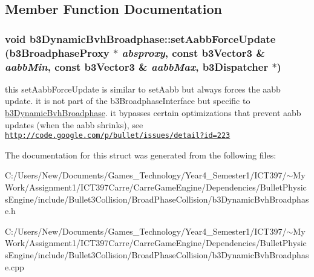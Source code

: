\subsection{Member Function Documentation}
\hypertarget{structb3_dynamic_bvh_broadphase_c18c206ccd45e8e2f0c817381d6840a0}{
\subsubsection[setAabbForceUpdate]{\setlength{\rightskip}{0pt plus 5cm}void b3DynamicBvhBroadphase::setAabbForceUpdate (b3BroadphaseProxy $\ast$ {\em absproxy}, \/  const b3Vector3 \& {\em aabbMin}, \/  const b3Vector3 \& {\em aabbMax}, \/  b3Dispatcher $\ast$)}}
\label{structb3_dynamic_bvh_broadphase_c18c206ccd45e8e2f0c817381d6840a0}


this setAabbForceUpdate is similar to setAabb but always forces the aabb update. it is not part of the b3BroadphaseInterface but specific to \hyperlink{structb3_dynamic_bvh_broadphase}{b3DynamicBvhBroadphase}. it bypasses certain optimizations that prevent aabb updates (when the aabb shrinks), see \href{http://code.google.com/p/bullet/issues/detail?id=223}{\tt http://code.google.com/p/bullet/issues/detail?id=223} 

The documentation for this struct was generated from the following files:\begin{CompactItemize}
\item 
C:/Users/New/Documents/Games\_\-Technology/Year4\_\-Semester1/ICT397/$\sim$My Work/Assignment1/ICT397Carre/CarreGameEngine/Dependencies/BulletPhysicsEngine/include/Bullet3Collision/BroadPhaseCollision/b3DynamicBvhBroadphase.h\item 
C:/Users/New/Documents/Games\_\-Technology/Year4\_\-Semester1/ICT397/$\sim$My Work/Assignment1/ICT397Carre/CarreGameEngine/Dependencies/BulletPhysicsEngine/include/Bullet3Collision/BroadPhaseCollision/b3DynamicBvhBroadphase.cpp\end{CompactItemize}
